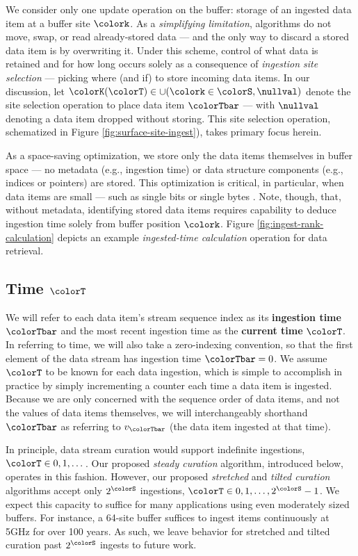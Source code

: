 We consider only one update operation on the buffer: storage of an ingested data item at a buffer site $\colork$.
As a \textit{simplifying limitation}, algorithms do not move, swap, or read already-stored data --- and the only way to discard a stored data item is by overwriting it.
Under this scheme, control of what data is retained and for how long occurs solely as a consequence of \textit{ingestion site selection} --- picking where (and if) to store incoming data items.
In our discussion, let $\colorK(\colorT) \in \cup(\colork \in \colorS, \nullval)$ denote the site selection operation to place data item $\colorTbar$ --- with $\nullval$ denoting a data item dropped without storing.
This site selection operation, schematized in Figure \ref{fig:surface-site-ingest}), takes primary focus herein.

As a space-saving optimization, we store only the data items themselves in buffer space --- no metadata (e.g., ingestion time) or data structure components (e.g., indices or pointers) are stored.
This optimization is critical, in particular, when data items are small --- such as single bits or single bytes \citep{moreno2022hereditary}.
Note, though, that, without metadata, identifying stored data items requires capability to deduce ingestion time solely from buffer position $\colork$.
Figure \ref{fig:ingest-rank-calculation} depicts an example \textit{ingested-time calculation} operation for data retrieval.

\subsection{Time $\colorT$}
\label{sec:notation-time}

We will refer to each data item's stream sequence index as its \textbf{ingestion time} $\colorTbar$ and the most recent ingestion time as the \textbf{current time} $\colorT$.
In referring to time, we will also take a zero-indexing convention, so that the first element of the data stream has ingestion time $\colorTbar=0$.
We assume $\colorT$ to be known for each data ingestion, which is simple to accomplish in practice by simply incrementing a counter each time a data item is ingested.
Because we are only concerned with the sequence order of data items, and not the values of data items themselves, we will interchangeably shorthand $\colorTbar$ as referring to $v_{\colorTbar}$ (the data item ingested at that time).

In principle, data stream curation would support indefinite ingestions, $\colorT \in 0, 1, \ldots \,$.
Our proposed \textit{steady curation} algorithm, introduced below, operates in this fashion.
However, our proposed \textit{stretched} and \textit{tilted curation} algorithms accept only $2^{\colorS}$ ingestions, $\colorT \in 0, 1, \ldots, 2^{\colorS} - 1$.
We expect this capacity to suffice for many applications using even moderately sized buffers.
For instance, a 64-site buffer suffices to ingest items continuously at 5GHz for over 100 years.
As such, we leave behavior for stretched and tilted curation past $2^{\colorS}$ ingests to future work.

